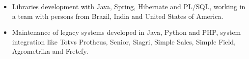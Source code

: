\documentclass[10pt,a4paper,ragged2e]{altacv}
\begin{document}

\begin{fullwidth}
\makecvheader
\end{fullwidth}




\begin{itemize}
  \item Libraries development with Java, Spring, Hibernate and PL/SQL, working in a team with persons from Brazil, India and United States of America.
\end{itemize}

\vspace{10px}

\begin{itemize}
  \item Maintenance of legacy systems developed in Java, Python and PHP, system integration like Totvs Protheus, Senior, Siagri, Simple Sales, Simple Field, Agrometrika and Fretefy.
\end{itemize}

\vspace{10px}
\end{document}
